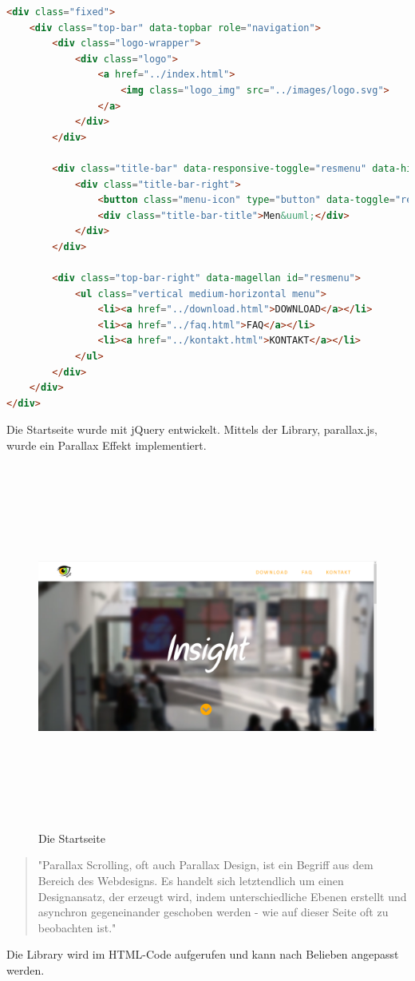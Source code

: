 \lstset{
  frame=leftline,
  breaklines=true,
}
\begin{lstlisting}[language=HTML, basicstyle=\scriptsize]
<div class="fixed">
	<div class="top-bar" data-topbar role="navigation">
		<div class="logo-wrapper">
			<div class="logo">
				<a href="../index.html">
					<img class="logo_img" src="../images/logo.svg">
				</a>
			</div>
		</div>

		<div class="title-bar" data-responsive-toggle="resmenu" data-hide-for="medium">
			<div class="title-bar-right">
				<button class="menu-icon" type="button" data-toggle="resmenu"></button>
				<div class="title-bar-title">Men&uuml;</div>
			</div>
		</div>

		<div class="top-bar-right" data-magellan id="resmenu">
			<ul class="vertical medium-horizontal menu">
				<li><a href="../download.html">DOWNLOAD</a></li>
				<li><a href="../faq.html">FAQ</a></li>
				<li><a href="../kontakt.html">KONTAKT</a></li>
			</ul>
		</div>
	</div>
</div>
\end{lstlisting} \leavevmode \newline
Die Startseite wurde mit jQuery entwickelt. Mittels der Library, parallax.js, wurde ein Parallax Effekt implementiert. 
\begin{figure}[ht]
	\centering				\includegraphics[width=12cm,height=12cm,keepaspectratio]{webseite_abb5} 
	\caption{Die Startseite}
\end{figure}
\begin{quote}
"Parallax Scrolling, oft auch Parallax Design, ist ein Begriff aus dem Bereich des Webdesigns. Es handelt sich letztendlich um einen Designansatz, der erzeugt wird, indem unterschiedliche Ebenen erstellt und asynchron gegeneinander geschoben werden - wie auf dieser Seite oft zu beobachten ist." \cite{parallaxzitat}
\end{quote}
Die Library wird im HTML-Code aufgerufen und kann nach Belieben angepasst werden. \leavevmode \newpage
